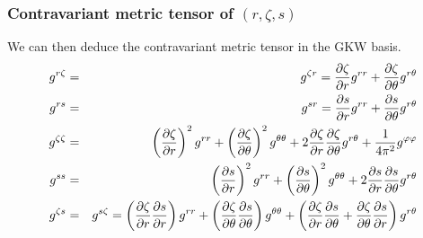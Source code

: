\subsubsection{Contravariant metric tensor of $(r,\zeta,s)$}
We can then deduce the contravariant metric tensor in the GKW basis.
\begin{eqnarray} 
g^{r \zeta} &=& g^{\zeta r} = \frac{\partial  \zeta}{\partial r}g^{rr} + \frac{\partial  \zeta}{\partial \theta}g^{r \theta} \\
g^{r s} &=& g^{s r} = \frac{\partial  s}{\partial r}g^{rr} + \frac{\partial  s}{\partial \theta}g^{r \theta} \\
g^{\zeta \zeta} &=& \left(\frac{\partial  \zeta}{\partial r} \right)^2 g^{rr} + \left(\frac{\partial  \zeta}{\partial \theta} \right)^2 g^{\theta \theta} + 2 \frac{\partial  \zeta}{\partial r} \frac{\partial  \zeta}{\partial \theta} g^{r \theta} + {1 \over 4 \pi^2} g^{\varphi \varphi} \\
g^{s s} &=& \left(\frac{\partial  s}{\partial r} \right)^2 g^{rr} + \left(\frac{\partial  s}{\partial \theta} \right)^2 g^{\theta \theta} + 2 \frac{\partial  s}{\partial r} \frac{\partial  s}{\partial \theta} g^{r \theta} \\
g^{\zeta s} &=& g^{s \zeta} = \left(\frac{\partial  \zeta}{\partial r}\frac{\partial  s}{\partial r} \right)g^{rr} + \left(\frac{\partial  \zeta}{\partial \theta}\frac{\partial  s}{\partial \theta} \right) g^{\theta \theta} + \left(\frac{\partial  \zeta}{\partial r}\frac{\partial  s}{\partial \theta} + \frac{\partial  \zeta}{\partial \theta}\frac{\partial  s}{\partial r} \right) g^{r \theta} 
\end{eqnarray}

